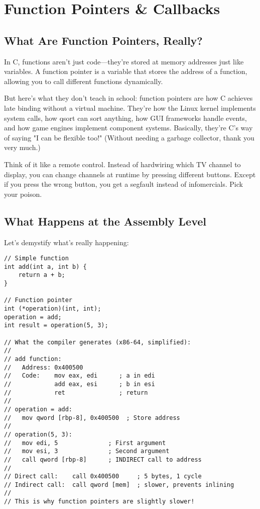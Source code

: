 \chapter{Function Pointers \& Callbacks}

\section{What Are Function Pointers, Really?}

In C, functions aren't just code---they're stored at memory addresses just like variables. A function pointer is a variable that stores the address of a function, allowing you to call different functions dynamically.

But here's what they don't teach in school: function pointers are how C achieves late binding without a virtual machine. They're how the Linux kernel implements system calls, how qsort can sort anything, how GUI frameworks handle events, and how game engines implement component systems. Basically, they're C's way of saying "I can be flexible too!" (Without needing a garbage collector, thank you very much.)

Think of it like a remote control. Instead of hardwiring which TV channel to display, you can change channels at runtime by pressing different buttons. Except if you press the wrong button, you get a segfault instead of infomercials. Pick your poison.

\section{What Happens at the Assembly Level}

Let's demystify what's really happening:

\begin{lstlisting}
// Simple function
int add(int a, int b) {
    return a + b;
}

// Function pointer
int (*operation)(int, int);
operation = add;
int result = operation(5, 3);

// What the compiler generates (x86-64, simplified):
//
// add function:
//   Address: 0x400500
//   Code:    mov eax, edi      ; a in edi
//            add eax, esi      ; b in esi
//            ret               ; return
//
// operation = add:
//   mov qword [rbp-8], 0x400500  ; Store address
//
// operation(5, 3):
//   mov edi, 5              ; First argument
//   mov esi, 3              ; Second argument
//   call qword [rbp-8]      ; INDIRECT call to address
//
// Direct call:    call 0x400500     ; 5 bytes, 1 cycle
// Indirect call:  call qword [mem]  ; slower, prevents inlining
//
// This is why function pointers are slightly slower!
\end{lstlisting}


